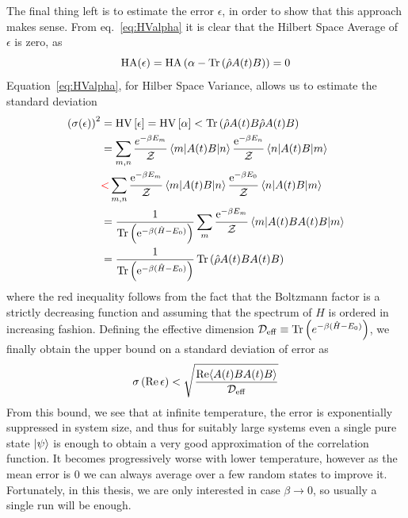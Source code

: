 The final thing left is to estimate the error \(\epsilon\), in order to show that this approach makes sense.
From eq.~\eqref{eq:HValpha} it is clear that the Hilbert Space Average of \(\epsilon\) is zero, as
\begin{equation}
	\mathrm{HA}(\epsilon) = \mathrm{HA}\left(\alpha - \Tr\left(\hat{\rho}A(t)B\right)\right) = 0
\end{equation}
Equation~\eqref{eq:HValpha}, for Hilber Space Variance, allows us to estimate the standard deviation
\begin{align}
	\left(\sigma(\epsilon)\right)^2 & = \mathrm{HV}\left[\epsilon\right] = \mathrm{HV}\left[\alpha\right] < \Tr\left(\hat{\rho}A(t)B \hat{\rho}A(t)B\right) \nonumber                                                  \\
	                                & = \sum_{m,n} \frac{e^{-\beta E_m}}{\mathcal{Z}} \matrixel{m}{A(t)B}{n} \frac{\mathrm{e}^{-\beta E_n}}{\mathcal{Z}} \matrixel{n}{A(t)B}{m}\nonumber                    \\
	                                & \textcolor{red}{<}  \sum_{m,n} \frac{\mathrm{e}^{-\beta E_m}}{\mathcal{Z}} \matrixel{m}{A(t)B}{n} \frac{\mathrm{e}^{-\beta E_0}}{\mathcal{Z}} \matrixel{n}{A(t)B}{m} \nonumber \\
	                                & = \frac{1}{\Tr\left(\mathrm{e}^{-\beta(\hat{H} -E_0)}\right)} \sum_{m} \frac{\mathrm{e}^{-\beta E_m}}{\mathcal{Z}} \matrixel{m}{A(t)B A(t) B}{m} \nonumber                            \\
	                                & = \frac{1}{\Tr\left(\mathrm{e}^{-\beta(\hat{H} -E_0)}\right)} \Tr\left(\hat{\rho} A(t)B A(t) B\right)
\end{align}
where the red inequality follows from the fact that the Boltzmann factor is a strictly decreasing function and assuming that the spectrum
of \(H\) is ordered in increasing fashion. Defining the effective dimension \(\mathcal{D}_{\mathrm{eff}} \equiv \Tr\left(e^{-\beta(\hat{H} - E_0)}\right)\),
we finally obtain the upper bound on a standard deviation of error as
\begin{equation}
	\sigma\left(\Re \epsilon\right) < \sqrt{\frac{\Re \langle A(t)B A(t) B \rangle}{\mathcal{D}_{\mathrm{eff}}}}
	\label{eq:dqt_bound}
\end{equation}
From this bound, we see that at infinite temperature, the error is exponentially suppressed in system size, and thus for suitably large systems even a single pure state \(\ket{\psi}\) is enough to obtain a very good approximation of the correlation function.
It becomes progressively worse with lower temperature, however as the mean error is \(0\) we can always average over a few random
states to improve it. Fortunately, in this thesis, we are only interested in case \(\beta \to 0\), so usually a single run will be enough.

